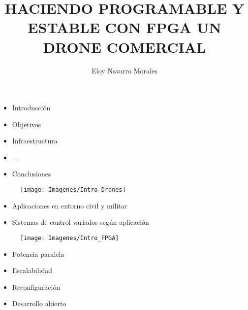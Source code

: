 \documentclass[a4,landscpae]{seminar}
\title{HACIENDO PROGRAMABLE Y ESTABLE CON FPGA UN DRONE COMERCIAL}
\author{Eloy Navarro Morales}
\begin{document}
\maketitle


\begin{hslide}
\begin{itemize}
	\item Introducci\'on
	\item Objetivos
	\item Infraestructura
	\item ...
	\item Conclusiones
\end{itemize}
\end{hslide}


\begin{hslide}
\begin{minipage}{6.1cm}
	\begin{figure}
		\texttt{[image: Imagenes/Intro\_Drones]}
	\end{figure}
\end{minipage} \hfill
\begin{minipage}{4.9cm}
	\begin{itemize}
		\item Aplicaciones en entorno civil y militar
		\item Sistemas de control variados seg\'un aplicaci\'on
	\end{itemize}
\end{minipage}

\end{hslide}


\begin{hslide}
\begin{minipage}{7cm}
	\begin{center}
		\begin{figure}
			\texttt{[image: Imagenes/Intro\_FPGA]}
		\end{figure}
	\end{center}
\end{minipage} \hfill
\begin{minipage}{3.5cm}
	\begin{itemize}
		\item Potencia paralela
		\item Escalabilidad
		\item Reconfiguraci\'on
		\item Desarrollo abierto
	\end{itemize}
\end{minipage}
\end{hslide}
\end{document}
